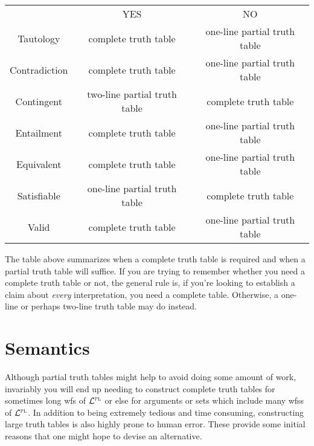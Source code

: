 \begin{table}[ht]
\begin{center}
\begin{tabular}{|c|c|c|}
\cline{1-3}
& YES & NO\\
\cline{1-3}
Tautology & complete truth table & one-line partial truth table\\
Contradiction &  complete truth table  & one-line partial truth table\\
Contingent & two-line partial truth table & complete truth table\\
Entailment & complete truth table & one-line partial truth table\\
Equivalent & complete truth table & one-line partial truth table\\
Satisfiable & one-line partial truth table & complete truth table\\
Valid & complete truth table & one-line partial truth table\\
\cline{1-3}
\end{tabular}
\end{center}
\end{table}

The table above summarizes when a complete truth table is required and when a partial truth table will suffice.
If you are trying to remember whether you need a complete truth table or not, the general rule is, if you're looking to establish a claim about \emph{every} interpretation, you need a complete table.
Otherwise, a one-line or perhaps two-line truth table may do instead.







\section{Semantics}%
  \label{sec:Semantics}

Although partial truth tables might help to avoid doing some amount of work, invariably you will end up needing to construct complete truth tables for sometimes long wfs of $\mathcal{L}^{\textsc{pl}}$ or else for arguments or sets which include many wfss of $\mathcal{L}^{\textsc{pl}}$.
In addition to being extremely tedious and time consuming, constructing large truth tables is also highly prone to human error.
These provide some initial reasons that one might hope to devise an alternative.


